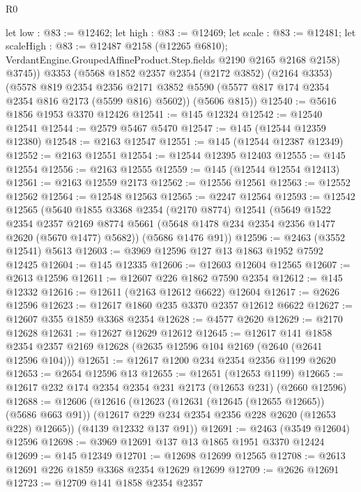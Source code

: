 \begin{lexlean}{R0}
\begin{coremodule}
        let low : @83 := @12462;
        let high : @83 := @12469;
        let scale : @83 := @12481;
        let scaleHigh : @83 := @12487 @2158 (@12265 @6810);
        VerdantEngine.GroupedAffineProduct.Step.fields @2190 @2165 @2168 @2158)
        @3745))
    @3353
    (@5568
      @1852
      @2357
      @2354
      (@2172 @3852)
      (@2164 @3353)
      (@5578
        @819
        @2354
        @2356
        @2171
        @3852
        @5590
        (@5577 @817 @174 @2354 @2354 @816 @2173 (@5599 @816) @5602))
      (@5606 @815))
@12540 := @5616 @1856 @1953 @3370 @12426
@12541 := @145 @12324
@12542 := @12540 @12541
@12544 := @2579 @5467 @5470
@12547 := @145 (@12544 @12359 @12380)
@12548 := @2163 @12547
@12551 := @145 (@12544 @12387 @12349)
@12552 := @2163 @12551
@12554 := @12544 @12395 @12403
@12555 := @145 @12554
@12556 := @2163 @12555
@12559 := @145 (@12544 @12554 @12413)
@12561 := @2163 @12559 @2173
@12562 := @12556 @12561
@12563 := @12552 @12562
@12564 := @12548 @12563
@12565 := @2247 @12564
@12593 := @12542
    @12565
    (@5640
      @1855
      @3368
      @2354
      (@2170 @8774)
      @12541
      (@5649
        @1522
        @2354
        @2357
        @2169
        @8774
        @5661
        (@5648 @1478 @234 @2354 @2356 @1477 @2620 (@5670 @1477) @5682))
      (@5686 @1476 @91))
@12596 := @2463 (@3552 @12541) @5613
@12603 := @3969 @12596 @127 @13 @1863 @1952 @7592 @12425
@12604 := @145 @12335
@12606 := @12603 @12604 @12565
@12607 := @2613 @12596
@12611 := @12607 @226 @1862 @7590 @2354
@12612 := @145 @12332
@12616 := @12611 (@2163 @12612 @6622) @12604
@12617 := @2626 @12596
@12623 := @12617 @1860 @235 @3370 @2357 @12612 @6622
@12627 := @12607 @355 @1859 @3368 @2354
@12628 := @4577 @2620
@12629 := @2170 @12628
@12631 := @12627 @12629 @12612
@12645 := @12617
    @141
    @1858
    @2354
    @2357
    @2169
    @12628
    (@2635 @12596 @104 @2169 (@2640 (@2641 @12596 @104)))
@12651 := @12617 @1200 @234 @2354 @2356 @1199 @2620
@12653 := @2654 @12596 @13
@12655 := @12651 (@12653 @1199)
@12665 := @12617 @232 @174 @2354 @2354 @231 @2173 (@12653 @231) (@2660 @12596)
@12688 := @12606
    (@12616
      (@12623
        (@12631 (@12645 (@12655 @12665)) (@5686 @663 @91))
        (@12617 @229 @234 @2354 @2356 @228 @2620 (@12653 @228) @12665))
      (@4139 @12332 @137 @91))
@12691 := @2463 (@3549 @12604) @12596
@12698 := @3969 @12691 @137 @13 @1865 @1951 @3370 @12424
@12699 := @145 @12349
@12701 := @12698 @12699 @12565
@12708 := @2613 @12691 @226 @1859 @3368 @2354 @12629 @12699
@12709 := @2626 @12691
@12723 := @12709
    @141
    @1858
    @2354
    @2357

\end{coremodule}
\end{lexlean}
